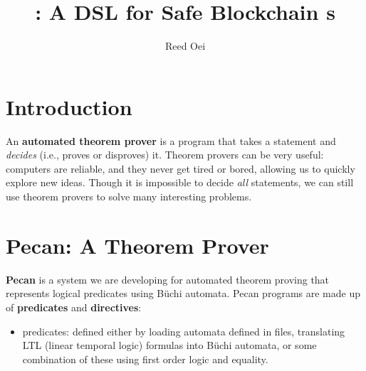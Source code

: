 \documentclass[landscape,usenames,dvipsnames]{sciposter}
\title{\langName: A DSL for Safe Blockchain \AssetTxt{}s}
\author{Reed Oei}
\begin{document}

\maketitle
\vspace{-3ex}
\begin{multicols}{3}  %



\section*{Introduction}

An \textbf{automated theorem prover} is a program that takes a statement and \emph{decides} (i.e., proves or disproves) it.
Theorem provers can be very useful: computers are reliable, and they never get tired or bored, allowing us to quickly explore new ideas.
Though it is impossible to decide \emph{all} statements, we can still use theorem provers to solve many interesting problems.

\section*{Pecan: A Theorem Prover}

\textbf{Pecan} is a system we are developing for automated theorem proving that represents logical predicates using B\"uchi automata.
Pecan programs are made up of \textbf{predicates} and \textbf{directives}:

\begin{itemize}
    \item predicates: defined either by loading automata defined in files, translating LTL (linear temporal logic) formulas into B\"uchi automata, or some combination of these using first order logic and equality.


\end{itemize}


\end{multicols}
\end{document}
